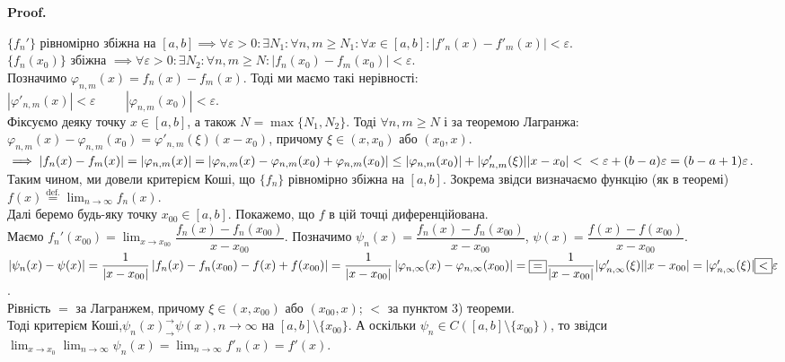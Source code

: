 \documentclass[a4paper, 10pt]{article}
\makeatletter
\def\huge{\displaystyle}
\theoremstyle{theoremdd}
\theoremstyle{theoremdd}
\theoremstyle{theoremdd}
\theoremstyle{theoremdd}
\theoremstyle{theoremdd}
\theoremstyle{theoremdd}
\theoremstyle{theoremdd}
\theoremstyle{theoremdd}
\theoremstyle{theoremdd}
\renewenvironment{proof}[1][Proof.\\]{\par
\pushQED{\hfill \qed}%
\normalfont \topsep6\p@\@plus6\p@\relax
\trivlist
\item\relax
{\bfseries
#1\@addpunct{.}}\hspace\labelsep\ignorespaces
}{%
\popQED\endtrivlist\@endpefalse
}
\makeatother
\begin{document}
\begin{proof}
$\{f_n'\}$ рівномірно збіжна на $[a,b] \implies \forall \varepsilon > 0: \exists N_1: \forall n,m \geq N_1: \forall x \in [a,b]: |f'_n(x) - f'_m(x)| < \varepsilon$.\\
$\{f_n(x_0)\}$ збіжна $\implies \forall \varepsilon > 0: \exists N_2: \forall n,m \geq N: |f_n(x_0) - f_m(x_0)| < \varepsilon$.\\
Позначимо $\varphi_{n,m}(x) = f_n(x) - f_m(x)$. Тоді ми маємо такі нерівності:\\
$|\varphi'_{n,m}(x)| < \varepsilon \hspace{1cm} |\varphi_{n,m}(x_0)| < \varepsilon$.\\
Фіксуємо деяку точку $x \in [a,b]$, а також $N = \max \{ N_1, N_2 \}$. Тоді $\forall n,m \geq N$ і за теоремою Лагранжа: $\varphi_{n,m}(x) - \varphi_{n,m}(x_0) = \varphi'_{n,m}(\xi) (x-x_0)$, причому $\xi \in (x,x_0)$ або $(x_0,x)$.\\
$\implies |f_n(x) - f_m(x)| = |\varphi_{n,m}(x)| = |\varphi_{n,m}(x) - \varphi_{n,m}(x_0) + \varphi_{n,m}(x_0)| \leq |\varphi_{n,m}(x_0)| + |\varphi'_{n,m}(\xi)| |x-x_0| < \\ < \varepsilon + (b-a)\varepsilon = (b-a+1)\varepsilon$.\\
Таким чином, ми довели критерієм Коші, що $\{f_n\}$ рівномірно збіжна на $[a,b]$. Зокрема звідси визначаємо функцію (як в теоремі) $f(x) \overset{\text{def.}}{=} \displaystyle\lim_{n \to \infty} f_n(x)$.
\bigskip \\
Далі беремо будь-яку точку $x_{00} \in [a,b]$. Покажемо, що $f$ в цій точці диференційована.\\
Маємо $f_n'(x_{00}) = \huge\lim_{x \to x_{00}} \dfrac{f_n(x) - f_n(x_{00})}{x-x_{00}}$. Позначимо $\psi_n(x) = \dfrac{f_n(x)-f_n(x_{00})}{x-x_{00}}$, $\psi(x) = \dfrac{f(x)-f(x_{00})}{x-x_{00}}$.\\
$|\psi_n(x) - \psi(x)| = \dfrac{1}{|x-x_{00}|} \left| f_n(x) - f_n(x_{00}) - f(x) + f(x_{00}) \right| = \dfrac{1}{|x-x_{00}|} \left| \varphi_{n,\infty}(x) - \varphi_{n,\infty}(x_{00}) \right| = \\ \boxed{=} \dfrac{1}{|x-x_{00}|} |\varphi_{n,\infty}'(\xi)| |x-x_{00}| = |\varphi_{n,\infty}'(\xi)| \boxed{<} \varepsilon$.\\

Рівність $\boxed{=}$ за Лагранжем, причому $\xi \in (x,x_{00})$ або $(x_{00},x)$; $\boxed{<}$ за пунктом 3) теореми.\\
Тоді  критерієм Коші,\fi $\psi_n(x)^\rightarrow_\rightarrow \psi(x), n \to \infty$ на $[a,b] \setminus \{x_{00}\}$. А оскільки $\psi_n \in C([a,b] \setminus \{x_{00}\})$, то звідси \\
 $\huge \lim_{x \to x_0} \lim_{n \to \infty} \psi_n(x) = \lim_{n \to \infty} f'_n(x) = f'(x)$.
\end{proof}
\end{document}

